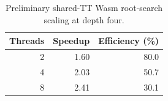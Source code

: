 \begin{table}[t]
\centering
\caption{Preliminary shared-TT Wasm root-search scaling at depth four.}
\label{tab:phase-eight-shared}
\begin{tabular}{rrr}
\toprule
Threads & Speedup & Efficiency (\%) \\
\midrule
2 & 1.60 & 80.0 \\
4 & 2.03 & 50.7 \\
8 & 2.41 & 30.1 \\
\bottomrule
\end{tabular}
\end{table}

